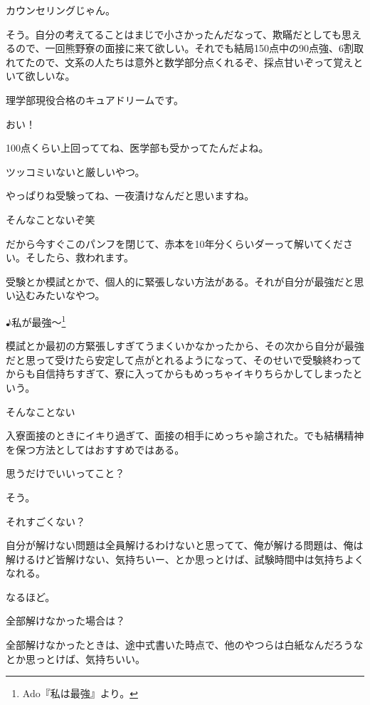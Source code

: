 \begin{multicols}{2}
カウンセリングじゃん。

そう。自分の考えてることはまじで小さかったんだなって、欺瞞だとしても思えるので、一回熊野寮の面接に来て欲しい。それでも結局150点中の90点強、6割取れてたので、文系の人たちは意外と数学部分点くれるぞ、採点甘いぞって覚えといて欲しいな。

理学部現役合格のキュアドリームです。

おい！

100点くらい上回っててね、医学部も受かってたんだよね。

ツッコミいないと厳しいやつ。

やっぱりね受験ってね、一夜漬けなんだと思いますね。

そんなことないぞ笑

だから今すぐこのパンフを閉じて、赤本を10年分くらいダーって解いてください。そしたら、救われます。

受験とか模試とかで、個人的に緊張しない方法がある。それが自分が最強だと思い込むみたいなやつ。

♪私が最強～\footnote{Ado『私は最強』より。}

模試とか最初の方緊張しすぎてうまくいかなかったから、その次から自分が最強だと思って受けたら安定して点がとれるようになって、そのせいで受験終わってからも自信持ちすぎて、寮に入ってからもめっちゃイキりちらかしてしまったという。

そんなことない

入寮面接のときにイキり過ぎて、面接の相手にめっちゃ諭された。でも結構精神を保つ方法としてはおすすめではある。

思うだけでいいってこと？

そう。

それすごくない？

自分が解けない問題は全員解けるわけないと思ってて、俺が解ける問題は、俺は解けるけど皆解けない、気持ちいー、とか思っとけば、試験時間中は気持ちよくなれる。

なるほど。

全部解けなかった場合は？

全部解けなかったときは、途中式書いた時点で、他のやつらは白紙なんだろうなとか思っとけば、気持ちいい。


\end{multicols}
